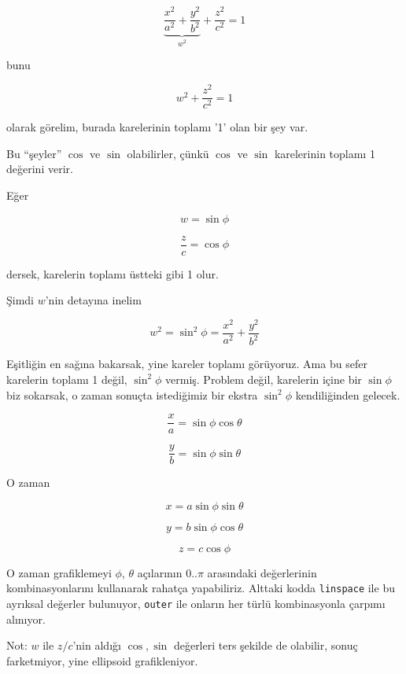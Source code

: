 \documentclass[12pt,fleqn]{article}\usepackage{../../common}
\begin{document}
$$ \underbrace{\frac{x^2}{a^2} +  \frac{y^2}{b^2}}_{w^2}
 + \frac{z^2}{c^2}  = 1  $$

bunu

$$ w^2 + \frac{z^2}{c^2}  = 1  $$

olarak görelim, burada karelerinin toplamı '1' olan bir şey var. 

Bu ``şeyler'' $\cos$ ve $\sin$ olabilirler, çünkü $\cos$ ve $\sin$ karelerinin
toplamı 1 değerini verir.

Eğer

$$ w = \sin \phi $$

$$ \frac{z}{c} = \cos \phi $$

dersek, karelerin toplamı üstteki gibi 1 olur. 

Şimdi $w$'nin detayına inelim

$$ w^2 = \sin^2\phi = \frac{x^2}{a^2} +  \frac{y^2}{b^2}  $$

Eşitliğin en sağına bakarsak, yine kareler toplamı görüyoruz. Ama bu sefer
karelerin toplamı 1 değil, $\sin^2\phi$ vermiş. Problem değil, karelerin
içine bir $\sin \phi$ biz sokarsak, o zaman sonuçta istediğimiz bir
ekstra $\sin^2\phi$ kendiliğinden gelecek. 

$$ \frac{x}{a} = \sin\phi \cos \theta  $$

$$ \frac{y}{b} = \sin\phi \sin\theta  $$

O zaman

$$ x = a \sin\phi \sin \theta  $$

$$ y = b \sin\phi \cos \theta  $$

$$ z = c \cos \phi $$

O zaman grafiklemeyi $\phi$, $\theta$ açılarının $0..\pi$ arasındaki
değerlerinin kombinasyonlarını kullanarak rahatça yapabiliriz. Alttaki kodda
\verb!linspace! ile bu ayrıksal değerler bulunuyor, \verb!outer! ile onların her
türlü kombinasyonla çarpımı alınıyor.

Not: $w$ ile $z/c$'nin aldığı $\cos, \sin$ değerleri ters şekilde de olabilir,
sonuç farketmiyor, yine ellipsoid grafikleniyor. 
\end{document}
